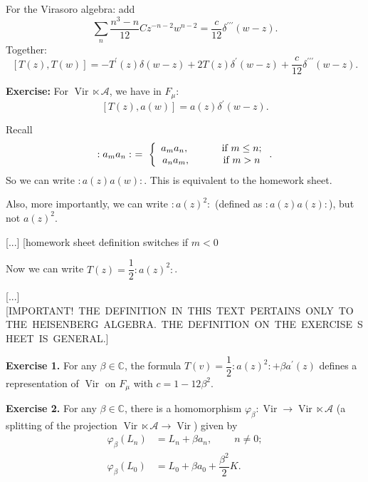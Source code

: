 \documentclass
[numbers=enddot,12pt,final,onecolumn,german,notitlepage]{scrartcl}%
\theoremstyle{definition}
\begin{document}
For the Virasoro algebra: add%
\[
\sum_{n}\dfrac{n^{3}-n}{12}Cz^{-n-2}w^{n-2}=\dfrac{c}{12}\delta^{\prime
\prime\prime}\left(  w-z\right)  .
\]
Together:%
\[
\left[  T\left(  z\right)  ,T\left(  w\right)  \right]  =-T^{\prime}\left(
z\right)  \delta\left(  w-z\right)  +2T\left(  z\right)  \delta^{\prime
}\left(  w-z\right)  +\dfrac{c}{12}\delta^{\prime\prime\prime}\left(
w-z\right)  .
\]


\textbf{Exercise:} For $\operatorname*{Vir}\ltimes\mathcal{A}$, we have in
$F_{\mu}$:%
\[
\left[  T\left(  z\right)  ,a\left(  w\right)  \right]  =a\left(  z\right)
\delta^{\prime}\left(  w-z\right)  .
\]


Recall%
\[
:a_{m}a_{n}:\ =\ \left\{
\begin{array}
[c]{c}%
a_{m}a_{n},\ \ \ \ \ \ \ \ \ \ \text{if }m\leq n;\\
a_{n}a_{m},\ \ \ \ \ \ \ \ \ \ \text{if }m>n
\end{array}
\right.  .
\]
So we can write $:a\left(  z\right)  a\left(  w\right)  :$. This is equivalent
to the homework sheet.

Also, more importantly, we can write $:a\left(  z\right)  ^{2}:$ (defined as
$:a\left(  z\right)  a\left(  z\right)  :$), but not $a\left(  z\right)  ^{2}$.

[...] [homework sheet definition switches if $m<0$

Now we can write $T\left(  z\right)  =\dfrac{1}{2}:a\left(  z\right)  ^{2}:$.

[...] [IMPORTANT!\ THE\ DEFINITION\ IN\ THIS\ TEXT\ PERTAINS\ ONLY\ TO\ THE\ HEISENBERG\ ALGEBRA.\ THE\ DEFINITION\ ON\ THE\ EXERCISE\ SHEET\ IS\ GENERAL.]

\textbf{Exercise 1.} For any $\beta\in\mathbb{C}$, the formula $T\left(
v\right)  =\dfrac{1}{2}:a\left(  z\right)  ^{2}:+\beta a^{\prime}\left(
z\right)  $ defines a representation of $\operatorname*{Vir}$ on $F_{\mu}$
with $c=1-12\beta^{2}$.

\textbf{Exercise 2.} For any $\beta\in\mathbb{C}$, there is a homomorphism
$\varphi_{\beta}:\operatorname*{Vir}\rightarrow\operatorname*{Vir}%
\ltimes\mathcal{A}$ (a splitting of the projection $\operatorname*{Vir}%
\ltimes\mathcal{A}\rightarrow\operatorname*{Vir}$) given by%
\begin{align*}
\varphi_{\beta}\left(  L_{n}\right)   &  =L_{n}+\beta a_{n}%
,\ \ \ \ \ \ \ \ \ \ n\neq0;\\
\varphi_{\beta}\left(  L_{0}\right)   &  =L_{0}+\beta a_{0}+\dfrac{\beta^{2}%
}{2}K.
\end{align*}
\end{document}
